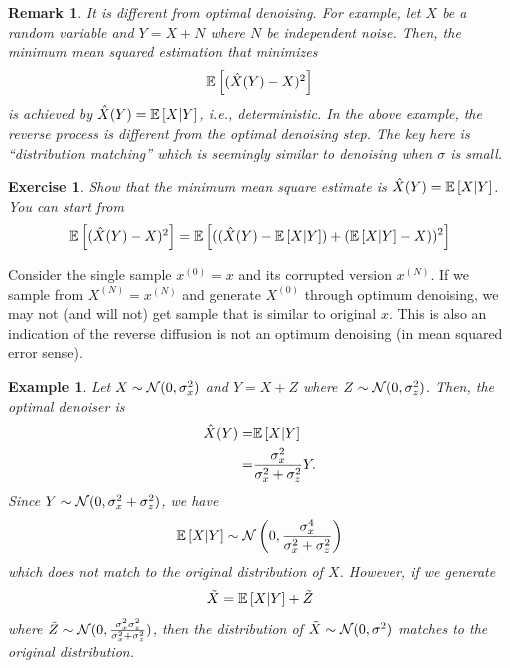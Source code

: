 \documentclass[11pt, a4paper]{article}
\newtheorem{exercise}{Exercise}
\newtheorem{remark}{Remark}
\newtheorem{example}{Example}
\begin{document}
\begin{remark}
    It is different from optimal denoising.
    For example, let $X$ be a random variable and $Y= X+N$ where $N$ be independent noise.
    Then, the minimum mean squared estimation that minimizes
    \begin{align}
        \Expec{(\hat{X}(Y)- X)^2}
    \end{align}
    is achieved by $\hat{X}(Y) = \Expec{X|Y}$, i.e., deterministic.
    In the above example, the reverse process is different from the optimal denoising step.
    The key here is ``distribution matching'' which is seemingly similar to denoising when $\sigma$ is small.
\end{remark}

\begin{exercise}
    Show that the minimum mean square estimate is $\hat{X}(Y) = \Expec{X|Y}$.
    You can start from
    \begin{align}
        \Expec{(\hat{X}(Y)-X)^2} = \Expec{((\hat{X}(Y)-\Expec{X|Y}) +(\Expec{X|Y}-X) )^2}
    \end{align}
\end{exercise}

Consider the single sample $x^{(0)}=x$ and its corrupted version $x^{(N)}$.
If we sample from $X^{(N)} = x^{(N)}$ and generate $X^{(0)}$ through optimum denoising, we may not (and will not) get sample that is similar to original $x$.
This is also an indication of the reverse diffusion is not an optimum denoising (in mean squared error sense).

\begin{example}
    Let $X\sim {\cal N}(0, \sigma_x^2)$ and $Y=X+Z$ where $Z\sim{\cal N}(0, \sigma_z^2)$.
    Then, the optimal denoiser is
    \begin{align}
        \hat{X}(Y) =& \Expec{X|Y}\\
        =& \frac{\sigma_x^2}{\sigma_x^2 + \sigma_z^2} Y.
    \end{align}
    Since $Y\sim {\cal N}(0, \sigma_x^2 + \sigma_z^2)$, we have
    \begin{align}
        \Expec{X|Y} \sim \cN\left(0, \frac{\sigma_x^4}{\sigma_x^2+\sigma_z^2}\right)
    \end{align}
    which does not match to the original distribution of $X$.
    However, if we generate
    \begin{align}
        \tilde{X} = \Expec{X|Y} + \tilde{Z}
    \end{align}
    where $\tilde{Z}\sim{\cal N}(0, \frac{\sigma_x^2\sigma_z^2}{\sigma_x^2+\sigma_z^2})$,
    then the distribution of $\tilde{X}\sim{\cal N}(0, \sigma^2)$ matches to the original distribution.
\end{example}
\end{document}
